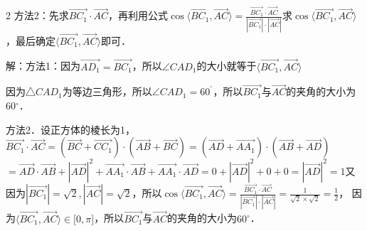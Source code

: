 \begin{multicols}{2}
\bindp 方法2：先求\(\overrightarrow{BC_{1}} \cdot \overrightarrow{AC}\)，再利用公式\(\cos\langle \overrightarrow{BC_{1}},\overrightarrow{AC} \rangle = \frac{\overrightarrow{BC_{1}} \cdot \overrightarrow{AC}}{| \overrightarrow{BC_{1}} | \cdot | \overrightarrow{AC} |}\)求\(\cos\langle \overrightarrow{BC_{1}},\overrightarrow{AC} \rangle\)，最后确定\(\langle \overrightarrow{BC_{1}},\overrightarrow{AC} \rangle\)即可．

\bindp [详解]解：方法1：因为\(\overrightarrow{AD_{1}} = \overrightarrow{BC_{1}}\)，所以\(\angle CAD_{1}\)的大小就等于\(\langle \overrightarrow{BC_{1}},\overrightarrow{AC} \rangle\)

\bindp 因为△\(CAD_{1}\)为等边三角形，所以\(\angle CAD_{1} = 60^{{^\circ}}\)，所以\(\overrightarrow{BC_{1}}\)与\(\overrightarrow{AC}\)的夹角的大小为\(60{^\circ}\)．

\bindp 方法2．设正方体的棱长为1，\(\overrightarrow{BC_{1}} \cdot \overrightarrow{AC} = ( \overrightarrow{BC} + \overrightarrow{CC_{1}} ) \cdot ( \overrightarrow{AB} + \overrightarrow{BC} ) = ( \overrightarrow{AD} + \overrightarrow{AA_{1}} ) \cdot ( \overrightarrow{AB} + \overrightarrow{AD} )\)\allowbreak\(= \overrightarrow{AD} \cdot \overrightarrow{AB} + | \overrightarrow{AD} |^{2} + \overrightarrow{AA_{1}} \cdot \overrightarrow{AB} + \overrightarrow{AA_{1}} \cdot \overrightarrow{AD} = 0 + | \overrightarrow{AD} |^{2} + 0 + 0 = | \overrightarrow{AD} |^{2} = 1\)又因为\(| \overrightarrow{BC_{1}} | = \sqrt{2},| \overrightarrow{AC} | = \sqrt{2}\)，所以\(\cos\langle \overrightarrow{BC_{1}},\overrightarrow{AC} \rangle = \frac{\overrightarrow{BC_{1}} \cdot \overrightarrow{AC}}{| \overrightarrow{BC_{1}} | \cdot | \overrightarrow{AC} |} = \frac{1}{\sqrt{2} \times \sqrt{2}} = \frac{1}{2}\)，
因为\(\langle \overrightarrow{BC_{1}},\overrightarrow{AC} \rangle \in \lbrack 0,\pi\rbrack\)，所以\(\overrightarrow{BC_{1}}\)与\(\overrightarrow{AC}\)的夹角的大小为\(60{^\circ}\)．





\end{multicols}
